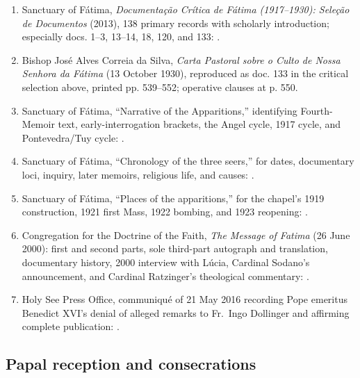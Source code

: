 \begin{enumerate}
  \item Sanctuary of Fátima, \emph{Documentação Crítica de Fátima (1917--1930): Seleção de Documentos} (2013), 138 primary records with scholarly introduction; especially docs. 1--3, 13--14, 18, 120, and 133: .
  \item Bishop José Alves Correia da Silva, \emph{Carta Pastoral sobre o Culto de Nossa Senhora da Fátima} (13 October 1930), reproduced as doc. 133 in the critical selection above, printed pp. 539--552; operative clauses at p. 550.
  \item Sanctuary of Fátima, “Narrative of the Apparitions,” identifying Fourth-Memoir text, early-interrogation brackets, the Angel cycle, 1917 cycle, and Pontevedra/Tuy cycle: .
  \item Sanctuary of Fátima, “Chronology of the three seers,” for dates, documentary loci, inquiry, later memoirs, religious life, and causes: .
  \item Sanctuary of Fátima, “Places of the apparitions,” for the chapel's 1919 construction, 1921 first Mass, 1922 bombing, and 1923 reopening: .
  \item Congregation for the Doctrine of the Faith, \emph{The Message of Fatima} (26 June 2000): first and second parts, sole third-part autograph and translation, documentary history, 2000 interview with Lúcia, Cardinal Sodano's announcement, and Cardinal Ratzinger's theological commentary: .
  \item Holy See Press Office, communiqué of 21 May 2016 recording Pope emeritus Benedict XVI's denial of alleged remarks to Fr.~Ingo Dollinger and affirming complete publication: .
\end{enumerate}

\subsection{Papal reception and consecrations}

